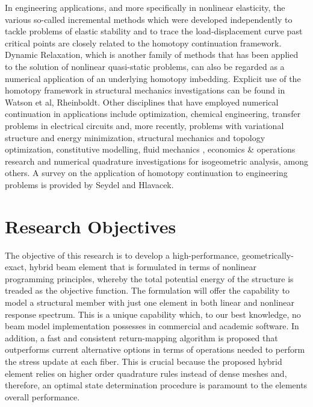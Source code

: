 In engineering applications, and more specifically in nonlinear elasticity, the 
various so-called incremental methods which were developed independently to tackle 
problems 
of elastic stability and to trace the load-displacement curve past critical
points\cite{Wempner:1971,Bergan:1978,Bergan:1978b,Batoz:1979,Riks:1979,Ramm:1981,Crisfield3}
are closely related to the homotopy continuation framework\cite{Rheinboldt:1983}. 
Dynamic Relaxation,
which is another family of
methods that has been applied to the solution of nonlinear quasi-static
problems\cite{Cassell:1970,Brew:1971,Stricklin:1971,Papadrakakis:1981,Park:1982},
can also be regarded as a numerical application of an underlying homotopy
imbedding\cite{Oden:1973}. Explicit use of the homotopy framework in structural
mechanics investigations can be found in Watson et 
al\cite{Watson:1981report,Watson:1985},
Rheinboldt\cite{Rheinboldt:1981}. Other disciplines that have employed numerical
continuation in applications include
optimization\cite{Poore:1988,Watson:1989,Zhenghua:1996,Hillermeier:2001,Song:2008},
chemical engineering\cite{Byrne:1985,Lin:1987,Kovach:1987}, transfer problems
in electrical circuits\cite{Ushida:1984} and, more recently, problems with 
variational structure and energy
minimization\cite{Hughes:2013,Mehta:2015,Mobahi:2015}, structural
mechanics\cite{Bilasse:2009,Banerjee:2013,Ligursky:2014,Sideris:2017,Groh:2018} and 
topology
optimization\cite{Chakraborty:2019}, constitutive modelling\cite{Tari:2017}, fluid 
mechanics\cite{Yu:2016,Brown:2016}
, economics \& operations
research\cite{Borkovsky:2010,Besanko:2010,Herings:2010} and numerical quadrature
investigations for isogeometric analysis\cite{Bartovn:2016,Barendrecht:2018}, among 
others. A survey on the 
application of homotopy continuation to engineering problems is provided by 
Seydel and Hlavacek\cite{Seydel:1987}.


\section{Research Objectives}
The objective of this research is to develop a high-performance, geometrically-exact, 
hybrid beam element that is formulated in terms of nonlinear programming principles, 
whereby the total potential energy of the structure is treaded as the objective 
function. The formulation will offer the capability to model a structural member with 
just one element in both linear and nonlinear response spectrum.  This is a 
unique capability which, to our best knowledge, no beam model implementation 
possesses 
in commercial and academic software. In addition, a fast and consistent 
return-mapping algorithm is proposed that outperforms current alternative 
options in terms of operations needed to perform the stress update at each 
fiber. This is crucial because the proposed hybrid element relies on higher 
order quadrature rules instead of dense meshes and, therefore, an optimal state 
determination procedure is paramount to the elements overall performance. 

